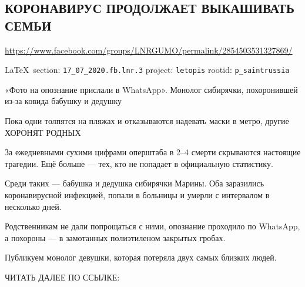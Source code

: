  
 

\subsection{КОРОНАВИРУС ПРОДОЛЖАЕТ ВЫКАШИВАТЬ СЕМЬИ}
\url{https://www.facebook.com/groups/LNRGUMO/permalink/2854503531327869/}
  
\vspace{0.5cm}
{\ifDEBUG\small\LaTeX~section: \verb|17_07_2020.fb.lnr.3| project: \verb|letopis| rootid: \verb|p_saintrussia|\fi}
\vspace{0.5cm}

«Фото на опознание прислали в WhatsApp».  Монолог сибирячки, похоронившей из-за
ковида бабушку и дедушку

Пока одни толпятся на пляжах и отказываются надевать маски в метро, другие
ХОРОНЯТ РОДНЫХ

За ежедневными сухими цифрами оперштаба в 2–4 смерти скрываются настоящие
трагедии.  Ещё больше — тех, кто не попадает в официальную статистику.

Среди таких — бабушка и дедушка сибирячки Марины.  Оба заразились
коронавирусной инфекцией, попали в больницы и умерли с интервалом в несколько
дней.

Родственникам не дали попрощаться с ними, опознание проходило по WhatsApp, а
похороны — в замотанных полиэтиленом закрытых гробах.

Публикуем монолог девушки, которая потеряла двух самых близких людей.

ЧИТАТЬ ДАЛЕЕ ПО ССЫЛКЕ: 
